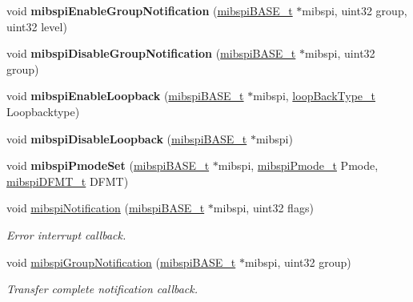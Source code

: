 \begin{DoxyCompactItemize}
\item 
\mbox{\label{group__MIBSPI_ga794ff0ed38140a38660cf93f98eb36ca}} 
void {\bfseries mibspi\+Enable\+Group\+Notification} (\mbox{\hyperlink{reg__mibspi_8h_a76bb471ca1dd17f94e340cca80dab5e6}{mibspi\+B\+A\+S\+E\+\_\+t}} $\ast$mibspi, uint32 group, uint32 level)
\item 
\mbox{\label{group__MIBSPI_ga6e90295632d3a85692fa06ab01f2e034}} 
void {\bfseries mibspi\+Disable\+Group\+Notification} (\mbox{\hyperlink{reg__mibspi_8h_a76bb471ca1dd17f94e340cca80dab5e6}{mibspi\+B\+A\+S\+E\+\_\+t}} $\ast$mibspi, uint32 group)
\item 
\mbox{\label{group__MIBSPI_ga9880a2139fa6e70d39f2998385b26a5a}} 
void {\bfseries mibspi\+Enable\+Loopback} (\mbox{\hyperlink{reg__mibspi_8h_a76bb471ca1dd17f94e340cca80dab5e6}{mibspi\+B\+A\+S\+E\+\_\+t}} $\ast$mibspi, \mbox{\hyperlink{sys__common_8h_aa61c8f392939c8448c7e3f17a3ecb51c}{loop\+Back\+Type\+\_\+t}} Loopbacktype)
\item 
\mbox{\label{group__MIBSPI_gaca093161e14ee2f45df18c5ecb67207f}} 
void {\bfseries mibspi\+Disable\+Loopback} (\mbox{\hyperlink{reg__mibspi_8h_a76bb471ca1dd17f94e340cca80dab5e6}{mibspi\+B\+A\+S\+E\+\_\+t}} $\ast$mibspi)
\item 
\mbox{\label{group__MIBSPI_ga36d68386f2af51ac599b05c70acd7551}} 
void {\bfseries mibspi\+Pmode\+Set} (\mbox{\hyperlink{reg__mibspi_8h_a76bb471ca1dd17f94e340cca80dab5e6}{mibspi\+B\+A\+S\+E\+\_\+t}} $\ast$mibspi, \mbox{\hyperlink{mibspi_8h_ab71b8fb84a67e7c5e3afc6da58df7055}{mibspi\+Pmode\+\_\+t}} Pmode, \mbox{\hyperlink{mibspi_8h_a0fc0143b953ed30b4601c7609f1ca4ef}{mibspi\+D\+F\+M\+T\+\_\+t}} D\+F\+MT)
\item 
void \mbox{\hyperlink{group__MIBSPI_ga003ad3b6efad9f83d79ce393f2c59798}{mibspi\+Notification}} (\mbox{\hyperlink{reg__mibspi_8h_a76bb471ca1dd17f94e340cca80dab5e6}{mibspi\+B\+A\+S\+E\+\_\+t}} $\ast$mibspi, uint32 flags)
\begin{DoxyCompactList}\small\item\em Error interrupt callback. \end{DoxyCompactList}\item 
void \mbox{\hyperlink{group__MIBSPI_ga56ca4c637b138b735ad4d3de542a84e0}{mibspi\+Group\+Notification}} (\mbox{\hyperlink{reg__mibspi_8h_a76bb471ca1dd17f94e340cca80dab5e6}{mibspi\+B\+A\+S\+E\+\_\+t}} $\ast$mibspi, uint32 group)
\begin{DoxyCompactList}\small\item\em Transfer complete notification callback. \end{DoxyCompactList}\end{DoxyCompactItemize}



